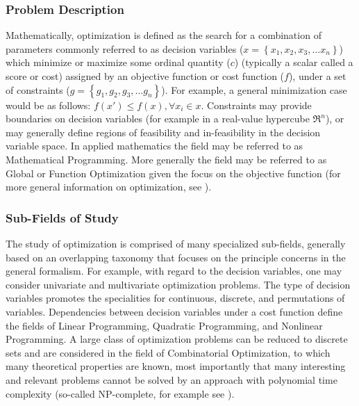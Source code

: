 %
%
\subsubsection{Problem Description}
Mathematically, optimization is defined as the search for a combination of parameters commonly referred to as decision variables ($x = \left\{x_1, x_2, x_3, \ldots x_n\right\}$) which minimize or maximize some ordinal quantity ($c$) (typically a scalar  called a score or cost) assigned by an objective function or cost function ($f$), under a set of constraints ($g = \left\{g_1, g_2, g_3, \ldots g_n\right\}$). For example, a general minimization case would be as follows: $f(x\prime) \leq f(x), \forall x_i \in x$. Constraints may provide boundaries on decision variables (for example in a real-value hypercube $\Re^n$), or may generally define regions of feasibility and in-feasibility in the decision variable space. In applied mathematics the field may be referred to as Mathematical Programming. More generally the field may be referred to as Global or Function Optimization given the focus on the objective function (for more general information on optimization, see \cite{Horst2000}). 

%
%
\subsubsection{Sub-Fields of Study}
The study of optimization is comprised of many specialized sub-fields, generally based on an overlapping taxonomy that focuses on the principle concerns in the general formalism. 
For example, with regard to the decision variables, one may consider univariate and multivariate optimization problems. The type of decision variables promotes the specialities for continuous, discrete, and permutations of variables. Dependencies between decision variables under a cost function define the fields of Linear Programming, Quadratic Programming, and Nonlinear Programming. A large class of optimization problems can be reduced to discrete sets and are considered in the field of Combinatorial Optimization, to which many theoretical properties are known, most importantly that many interesting and relevant problems cannot be solved by an approach with polynomial time complexity (so-called NP-complete, for example see \cite{Papadimitriou1998}).

